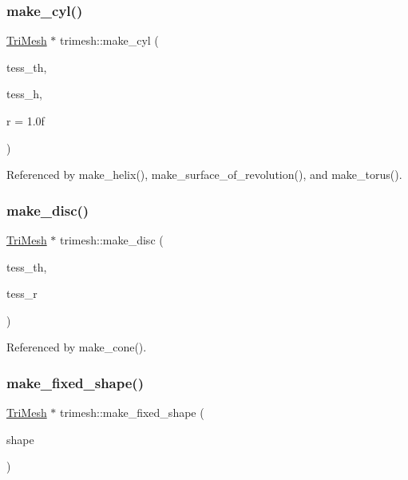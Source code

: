 \mbox{\label{namespacetrimesh_a903dc8c22c95c9005ccbded226416d17}} 
\subsubsection{\texorpdfstring{make\+\_\+cyl()}{make\_cyl()}}
{\footnotesize\ttfamily \hyperlink{classtrimesh_1_1TriMesh}{Tri\+Mesh} $\ast$ trimesh\+::make\+\_\+cyl (\begin{DoxyParamCaption}\item[{int}]{tess\+\_\+th,  }\item[{int}]{tess\+\_\+h,  }\item[{float}]{r = {\ttfamily 1.0f} }\end{DoxyParamCaption})}



Referenced by make\+\_\+helix(), make\+\_\+surface\+\_\+of\+\_\+revolution(), and make\+\_\+torus().

\mbox{\label{namespacetrimesh_a1030b871fc3bc5612fef3ceebd64f1c5}} 
\subsubsection{\texorpdfstring{make\+\_\+disc()}{make\_disc()}}
{\footnotesize\ttfamily \hyperlink{classtrimesh_1_1TriMesh}{Tri\+Mesh} $\ast$ trimesh\+::make\+\_\+disc (\begin{DoxyParamCaption}\item[{int}]{tess\+\_\+th,  }\item[{int}]{tess\+\_\+r }\end{DoxyParamCaption})}



Referenced by make\+\_\+cone().

\mbox{\label{namespacetrimesh_a2fb2e09b33c2888f076292ff845960b0}} 
\subsubsection{\texorpdfstring{make\+\_\+fixed\+\_\+shape()}{make\_fixed\_shape()}}
{\footnotesize\ttfamily \hyperlink{classtrimesh_1_1TriMesh}{Tri\+Mesh} $\ast$ trimesh\+::make\+\_\+fixed\+\_\+shape (\begin{DoxyParamCaption}\item[{\hyperlink{namespacetrimesh_ad11e2786eb398003af80c2dceef6d5a3}{Fixed\+Shape}}]{shape }\end{DoxyParamCaption})}



